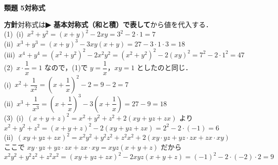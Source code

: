 \documentclass[a4paper,11pt]{ltjsarticle}
\newcommand{\ans}[2]{\Needspace{5\baselineskip}\vspace{6pt}%
  {\sffamily\bfseries 類題 #1\quad #2}\par}
\newcommand{\point}[1]{\textsf{\bfseries ▶ #1}}
\begin{document}
\ans{5}{対称式}
\begin{kai}
\textbf{方針}\quad 対称式は\point{基本対称式（和と積）で表して}から値を代入する．\\[2pt]
(1)\ (i)\ $x^2+y^2=(x+y)^2-2xy=3^2-2\cdot1=7$\\
\hspace*{1.5em}(ii)\ $x^3+y^3=(x+y)^3-3xy(x+y)=27-3\cdot1\cdot3=18$\\
\hspace*{1.5em}(iii)\ $x^4+y^4=(x^2+y^2)^2-2x^2y^2=(x^2+y^2)^2-2(xy)^2=7^2-2\cdot1^2=47$\\[2pt]
(2)\ $x\cdot\dfrac1x=1$ なので，(1)で $y=\dfrac1x$，$xy=1$ としたのと同じ．\\
\hspace*{1.5em}(i)\ $x^2+\dfrac1{x^2}=\left(x+\dfrac1x\right)^2-2=9-2=7$\\[2pt]
\hspace*{1.5em}(ii)\ $x^3+\dfrac1{x^3}=\left(x+\dfrac1x\right)^3-3\left(x+\dfrac1x\right)=27-9=18$\\[2pt]
(3)\ (i)\ $(x+y+z)^2=x^2+y^2+z^2+2(xy+yz+zx)$ より\\
\hspace*{1.5em}$x^2+y^2+z^2=(x+y+z)^2-2(xy+yz+zx)=2^2-2\cdot(-1)=6$\\[2pt]
\hspace*{1.5em}(ii)\ $(xy+yz+zx)^2=x^2y^2+y^2z^2+z^2x^2+2(xy\cdot yz+yz\cdot zx+zx\cdot xy)$\\
\hspace*{1.5em}ここで $xy\cdot yz+yz\cdot zx+zx\cdot xy=xyz(x+y+z)$ だから\\
\hspace*{1.5em}$x^2y^2+y^2z^2+z^2x^2=(xy+yz+zx)^2-2xyz(x+y+z)=(-1)^2-2\cdot(-2)\cdot2=9$
\end{kai}
\end{document}
